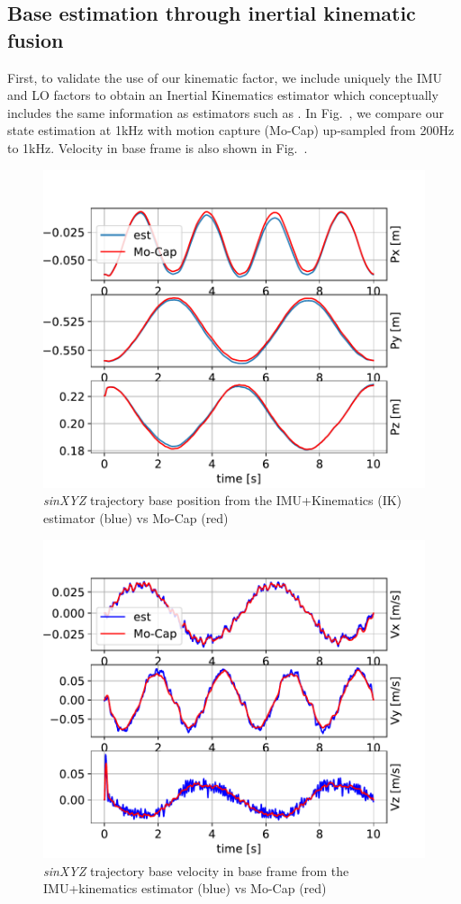 \subsection{Base estimation through inertial kinematic fusion}
First, to validate the use of our kinematic factor, we include uniquely the IMU and LO factors to obtain an Inertial Kinematics  estimator which 
conceptually includes the same information as estimators such as \cite{bloesch2013state}. In Fig.~, we compare our state estimation 
at 1kHz with motion capture (Mo-Cap) up-sampled from 200Hz to 1kHz.
Velocity in base frame is also shown in Fig.~.
%
\begin{figure}[t]
    \centering
    \includegraphics[height=0.6\columnwidth]{figures/centroidal/base_position_IK4.pdf}
    \caption{\textit{sinXYZ} trajectory base position from the IMU+Kinematics (IK) estimator (blue) vs Mo-Cap (red)}
    \label{fig:PosiIK4}
\end{figure}
%
\begin{figure}[t]
    \centering
    \includegraphics[height=0.6\columnwidth]{figures/centroidal/base_velocity_base_frame_IK4.pdf}
    \caption{\textit{sinXYZ} trajectory base velocity in base frame from the IMU+kinematics estimator (blue) vs Mo-Cap (red)}
    \label{fig:VelIK4}
\end{figure}

